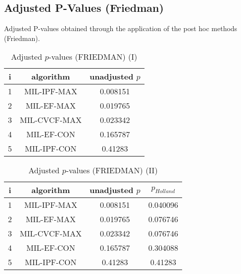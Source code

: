 \documentclass[a4paper,10pt]{article}
\begin{document}
\begin{landscape}
\newpage

\section{Adjusted P-Values (Friedman)}


Adjusted P-values obtained through the application of the post hoc methods (Friedman).

\begin{table}[!htp]
\centering\small
\begin{tabular}{ccc}
i&algorithm&unadjusted $p$\\
\hline1&MIL-IPF-MAX&0.008151\\2&MIL-EF-MAX&0.019765\\3&MIL-CVCF-MAX&0.023342\\4&MIL-EF-CON&0.165787\\5&MIL-IPF-CON&0.41283\\\hline
\end{tabular}
\caption{Adjusted $p$-values (FRIEDMAN) (I)}
\end{table}
\begin{table}[!htp]
\centering\small
\begin{tabular}{cccc}
i&algorithm&unadjusted $p$&$p_{Holland}$\\
\hline1&MIL-IPF-MAX&0.008151&0.040096\\2&MIL-EF-MAX&0.019765&0.076746\\3&MIL-CVCF-MAX&0.023342&0.076746\\4&MIL-EF-CON&0.165787&0.304088\\5&MIL-IPF-CON&0.41283&0.41283\\\hline
\end{tabular}
\caption{Adjusted $p$-values (FRIEDMAN) (II)}
\end{table}

\newpage
\end{landscape}
\end{document}
